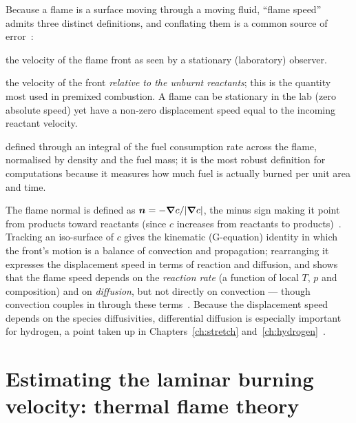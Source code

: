 Because a flame is a surface moving through a moving fluid, ``flame speed'' admits three distinct definitions, and conflating them is a common source of error~\cite{transcript_l9,lecture9}:
\begin{description}[leftmargin=1.5em,itemsep=2pt]
\item[Absolute speed] the velocity of the flame front as seen by a stationary (laboratory) observer.
\item[Displacement speed $s_d$] the velocity of the front \emph{relative to the unburnt reactants}; this is the quantity most used in premixed combustion. A flame can be stationary in the lab (zero absolute speed) yet have a non-zero displacement speed equal to the incoming reactant velocity.
\item[Consumption speed] defined through an integral of the fuel consumption rate across the flame, normalised by density and the fuel mass; it is the most robust definition for computations because it measures how much fuel is actually burned per unit area and time.
\end{description}
The flame normal is defined as $\boldsymbol{n}=-\boldsymbol{\nabla} c/|\boldsymbol{\nabla} c|$, the minus sign making it point from products toward reactants (since $c$ increases from reactants to products)~\cite{lecture9,transcript_l9}. Tracking an iso-surface of $c$ gives the kinematic (G-equation) identity in which the front's motion is a balance of convection and propagation; rearranging it expresses the displacement speed in terms of reaction and diffusion, and shows that the flame speed depends on the \emph{reaction rate} (a function of local $T$, $p$ and composition) and on \emph{diffusion}, but not directly on convection --- though convection couples in through these terms~\cite{lecture9,transcript_l9}. Because the displacement speed depends on the species diffusivities, differential diffusion is especially important for hydrogen, a point taken up in Chapters~\ref{ch:stretch} and~\ref{ch:hydrogen}~\cite{lecture9}.

\section{Estimating the laminar burning velocity: thermal flame theory}


